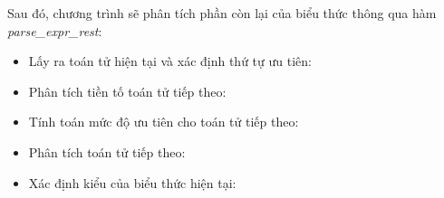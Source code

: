 Sau đó, chương trình sẽ phân tích phần còn lại của biểu thức thông qua hàm \textit{parse\_expr\_rest}:
\begin{itemize}
    \item Lấy ra toán tử hiện tại và xác định thứ tự ưu tiên:
        

        
    \item Phân tích tiền tố toán tử tiếp theo:

        
    \item Tính toán mức độ ưu tiên cho toán tử tiếp theo:

        
    \item Phân tích toán tử tiếp theo:

        
    \item Xác định kiểu của biểu thức hiện tại:
        

\end{itemize}
